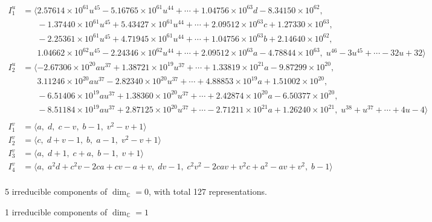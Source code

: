 \documentclass[1p]{elsarticle_modified}
\theoremstyle{definition}
\begin{document}
\begin{align*}
I^u_{1}&=\langle 
2.57614\times10^{61} u^{45}-5.16765\times10^{61} u^{44}+\cdots+1.04756\times10^{63} d-8.34150\times10^{62},\\
\phantom{I^u_{1}}&\phantom{= \langle  }-1.37440\times10^{61} u^{45}+5.43427\times10^{61} u^{44}+\cdots+2.09512\times10^{63} c+1.27330\times10^{63},\\
\phantom{I^u_{1}}&\phantom{= \langle  }-2.25361\times10^{61} u^{45}+4.71945\times10^{61} u^{44}+\cdots+1.04756\times10^{63} b+2.14640\times10^{62},\\
\phantom{I^u_{1}}&\phantom{= \langle  }1.04662\times10^{62} u^{45}-2.24346\times10^{62} u^{44}+\cdots+2.09512\times10^{63} a-4.78844\times10^{63},\;u^{46}-3 u^{45}+\cdots-32 u+32\rangle \\
I^u_{2}&=\langle 
-2.67306\times10^{20} a u^{37}+1.38721\times10^{19} u^{37}+\cdots+1.33819\times10^{21} a-9.87299\times10^{20},\\
\phantom{I^u_{2}}&\phantom{= \langle  }3.11246\times10^{20} a u^{37}-2.82340\times10^{20} u^{37}+\cdots+4.88853\times10^{19} a+1.51002\times10^{20},\\
\phantom{I^u_{2}}&\phantom{= \langle  }-6.51406\times10^{19} a u^{37}+1.38360\times10^{20} u^{37}+\cdots+2.42874\times10^{20} a-6.50377\times10^{20},\\
\phantom{I^u_{2}}&\phantom{= \langle  }-8.51184\times10^{19} a u^{37}+2.87125\times10^{20} u^{37}+\cdots-2.71211\times10^{21} a+1.26240\times10^{21},\;u^{38}+u^{37}+\cdots+4 u-4\rangle \\
\\
I^v_{1}&=\langle 
a,\;d,\;c- v,\;b-1,\;v^2- v+1\rangle \\
I^v_{2}&=\langle 
c,\;d+v-1,\;b,\;a-1,\;v^2- v+1\rangle \\
I^v_{3}&=\langle 
a,\;d+1,\;c+a,\;b-1,\;v+1\rangle \\
I^v_{4}&=\langle 
a,\;a^2 d+c^2 v-2 c a+c v- a+v,\;d v-1,\;c^2 v^2-2 c a v+v^2 c+a^2- a v+v^2,\;b-1\rangle \\
\end{align*}
\raggedright * 5 irreducible components of $\dim_{\mathbb{C}}=0$, with total 127 representations.\\
\raggedright * 1 irreducible components of $\dim_{\mathbb{C}}=1$ \\
\newpage
\renewcommand{\arraystretch}{1}
\end{document}
